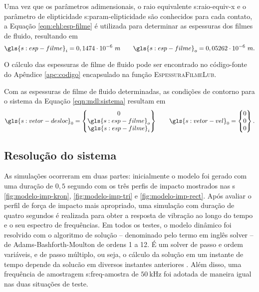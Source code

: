 \documentclass[12pt,oneside,english,brazil,lmodern,siglas,simbolos,cite=num]{ucsmonograph}
\begin{document}
	Uma vez que os parâmetros adimensionais, o raio equivalente \gls{s:raio-equiv-x} e o parâmetro de elipticidade \gls{s:param-elipticidade} são conhecidos para cada contato, a Equação \ref{eqn:ehl:esp-filme} é utilizada para determinar as espessuras dos filmes de fluido, resultando em
	\begin{equation*}
		\gls{s:esp-filme}_i = 0,1474\cdot 10^{-6}\ m \qquad
		\gls{s:esp-filme}_o = 0,05262\cdot 10^{-6}\ m.
	\end{equation*}
	
	O cálculo das espessuras de filme de fluido pode ser encontrado no código-fonte do Apêndice \ref{apc:codigo} encapsulado na função \textsc{EspessuraFilmeLub}.
	
	Com as espessuras de filme de fluido determinadas, as condições de contorno para o sistema da Equação \ref{eqn:mdl:sistema} resultam em
	\begin{equation*}
		\gls{s:vetor-desloc}_0 =
		\begin{Bmatrix}
		0 \\ \gls{s:esp-filme}_o \\ \gls{s:esp-filme}_i
		\end{Bmatrix} \qquad
		\gls{s:vetor-vel}_0 = 
		\begin{Bmatrix}
		0 \\ 0 \\ 0
		\end{Bmatrix}.
	\end{equation*}
	
	\subsection{Resolução do sistema} \label{sec:mdl:sol-sistema}
	As simulações ocorreram em duas partes: inicialmente o modelo foi gerado com uma duração de $0,5$ segundo com os três perfis de impacto mostrados nas {\figurename s} \ref{fig:modelo-imp-kron}, \ref{fig:modelo-imp-tri} e \ref{fig:modelo-imp-rect}.	
	Após avaliar o perfil de força de impacto mais apropriado, uma simulação com duração de quatro segundos é realizada para obter a resposta de vibração ao longo do tempo e o seu espectro de frequências.
	Em todos os testes, o modelo dinâmico foi resolvido com o algoritmo de solução -- denominado pelo termo em inglês \foreignlanguage{english}{solver} -- de Adams-Bashforth-Moulton de ordens 1 a 12.
	É um \foreignlanguage{english}{solver} de passo e ordem variáveis, e de passo múltiplo, ou seja, o cálculo da solução em um instante de tempo depende da solucão em diversos instantes anteriores \cite{ode113}.
	Além disso, uma frequência de amostragem \gls{s:freq-amostra} de $50\ \text{kHz}$ foi adotada de maneira igual nas duas situações de teste.
	
\end{document}
